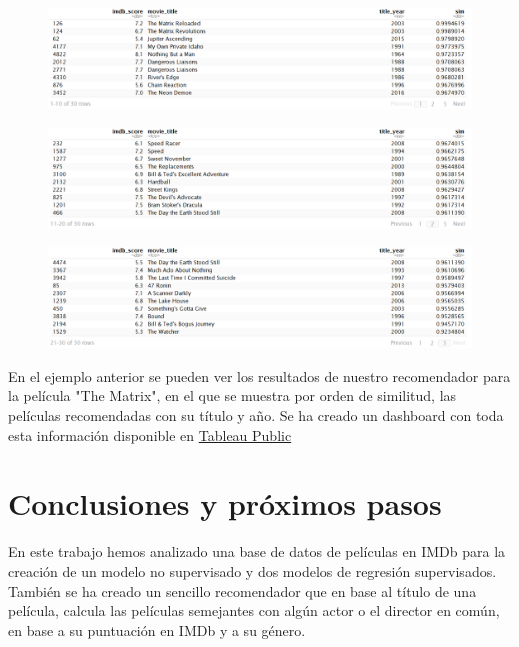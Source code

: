 \documentclass{article}
\begin{document}
\begin{figure}[h]
\centering
\includegraphics[width=5in,clip,keepaspectratio]{./images_latex/recommender1}
\end{figure}

\begin{figure}[h]
\centering
\includegraphics[width=5in,clip,keepaspectratio]{./images_latex/recommender2}
\end{figure}

\begin{figure}[h]
\centering
\includegraphics[width=5in,clip,keepaspectratio]{./images_latex/recommender3}
\end{figure}

En el ejemplo anterior se pueden ver los resultados de nuestro recomendador para la película "The Matrix", en el que se muestra por orden de similitud, las películas recomendadas con su título y año. Se ha creado un dashboard con toda esta información disponible en \href{https://public.tableau.com/profile/javier6580\#!/vizhome/proyecto_fin_de_master_recommender/recommender}{Tableau Public}

\clearpage

\section{Conclusiones y próximos pasos}

En este trabajo hemos analizado una base de datos de películas en IMDb para la creación de un modelo no supervisado y dos modelos de regresión supervisados. También se ha creado un sencillo recomendador que en base al título de una película, calcula las películas semejantes con algún actor o el director en común, en base a su puntuación en IMDb y a su género.
\end{document}
